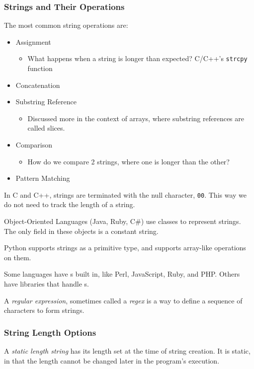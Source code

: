 \subsubsection{Strings and Their Operations}\label{subsubsec:String_Types_and_Ops}
The most common string operations are:
\begin{itemize}[noitemsep]
\item Assignment
  \begin{itemize}[noitemsep]
  \item What happens when a string is longer than expected? C/C++'s \texttt{strcpy} function
  \end{itemize}
\item Concatenation
\item Substring Reference
  \begin{itemize}[noitemsep]
  \item Discussed more in the context of arrays, where substring references are called slices.
  \end{itemize}
\item Comparison
  \begin{itemize}[noitemsep]
  \item How do we compare 2 strings, where one is longer than the other?
  \end{itemize}
\item Pattern Matching
\end{itemize}

In C and C++, strings are terminated with the null character, \texttt{00}.
This way we do not need to track the length of a string.

Object-Oriented Languages (Java, Ruby, C\#) use classes to represent strings.
The only field in these objects is a constant string.

Python supports strings as a primitive type, and supports array-like operations on them.

Some languages have s built in, like Perl, JavaScript, Ruby, and PHP.\@
Others have libraries that handle s.

\begin{definition}\label{def:Regular_Expression}
    A \emph{regular expression}, sometimes called a \emph{regex} is a way to define a sequence of characters to form strings.
\end{definition}

\subsubsection{String Length Options}\label{subsubsec:String_Type_Length_Options}
\begin{definition}\label{def:Static_Length_String}
  A \emph{static length string} has its length set at the time of string creation.
  It is static, in that the length cannot be changed later in the program's execution.
\end{definition}

